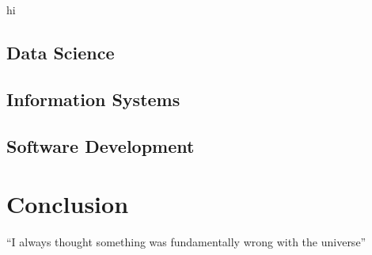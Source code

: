 \documentclass{article}
\begin{document}
hi
\subsection{Data Science}


\subsection{Information Systems}


\subsection{Software Development}

\section{Conclusion}
``I always thought something was fundamentally wrong with the universe'' \citep{adams1995hitchhiker}



\end{document}
